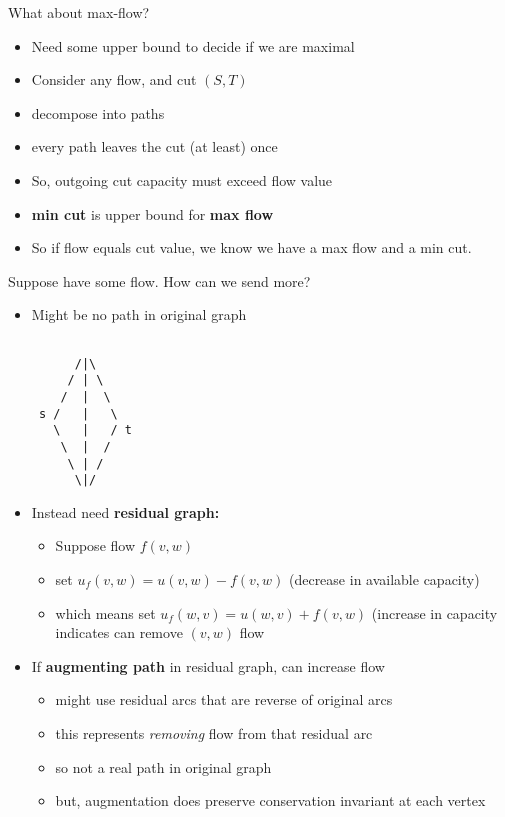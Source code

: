 \documentclass{article}
\begin{document}

What about max-flow? 		%
\begin{itemize}
\item Need some upper bound to decide if we are maximal
\item Consider any flow, and cut $(S,T)$
\item decompose into paths
\item every path leaves the cut (at least) once
\item So, outgoing cut capacity must exceed flow value
\item \textbf{min cut} is upper bound for \textbf{max flow}
\item So if flow equals cut value, we know we have a max flow and a min cut.
\end{itemize}

Suppose have some flow.  How can we send more?
\begin{itemize}
\item Might be no path in original graph
\begin{verbatim}

      /|\
     / | \
    /  |  \
 s /   |   \
   \   |   / t
    \  |  /
     \ | /
      \|/

\end{verbatim}
\item Instead need \textbf{residual graph:}
\begin{itemize}
\item Suppose flow $f(v,w)$
\item set $u_f(v,w) = u(v,w)-f(v,w)$ (decrease in available capacity)
\item which means set $u_f(w,v) = u(w,v)+f(v,w)$ (increase in capacity indicates
  can remove $(v,w)$ flow
\end{itemize}
\item If \textbf{augmenting path} in residual graph, can increase flow
  \begin{itemize}
  \item might use residual arcs that are reverse of original arcs
  \item this represents \emph{removing} flow from that residual arc
  \item so not a real path in original graph
  \item but, augmentation does preserve conservation invariant at each vertex
  \end{itemize}
\end{itemize}
\end{document}
